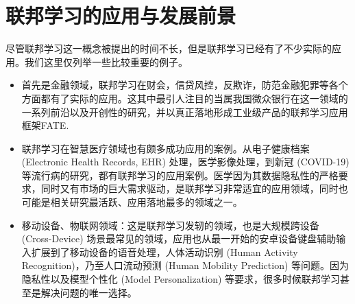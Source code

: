 \section{联邦学习的应用与发展前景}
\label{sec:chap1-fl-applications}


尽管联邦学习这一概念被提出\cite{mcmahan2017fed_avg}的时间不长，但是联邦学习已经有了不少实际的应用。我们这里仅列举一些比较重要的例子。
\begin{itemize}
    \item 首先是金融领域，联邦学习在财会\cite{Schreyer_2022_fl_audits}，信贷风控\cite{Imteaj_2022_fl}，反欺诈\cite{Lv_2021_fl}，防范金融犯罪\cite{Toyotaro_2019_fl}等各个方面都有了实际的应用。这其中最引人注目的当属我国微众银行在这一领域的一系列前沿以及开创性的研究\cite{Yang_2019_VFL, liu_2020_transfer_fl, vfl}，并以真正落地形成工业级产品的联邦学习应用框架FATE\cite{liu_2021_fate_fl}.
    \item 联邦学习在智慧医疗领域也有颇多成功应用的案例\cite{rauniyar2022_fl_medical, Antunes_2022_fl_healthcare}。从电子健康档案 (Electronic Health Records, EHR) 处理\cite{Brisimi_2018_fl_ehr}，医学影像处理\cite{Li_2020_fl_mri}，到新冠 (COVID-19) 等流行病的研究\cite{Dayan_2021_fl_covid}，都有联邦学习的应用案例。医学因为其数据隐私性的严格要求，同时又有市场的巨大需求驱动，是联邦学习非常适宜的应用领域，同时也可能是相关研究最活跃、应用落地最多的领域之一。
    \item 移动设备、物联网领域：这是联邦学习发轫\cite{mcmahan2017fed_avg}的领域，也是大规模跨设备 (Cross-Device) 场景最常见的领域，应用也从最一开始的安卓设备键盘辅助输入扩展到了移动设备的语音处理\cite{Leroy_2019_fl_ks}，人体活动识别 (Human Activity Recognition)\cite{Sozinov_2018_fl_human}，乃至人口流动预测 (Human Mobility Prediction)\cite{feng_2020_fl_pmf} 等问题。因为隐私性以及模型个性化 (Model Personalization) 等要求，很多时候联邦学习甚至是解决问题的唯一选择。
\end{itemize}

